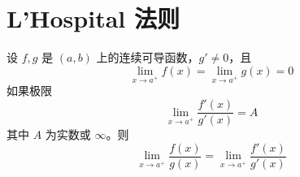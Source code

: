 \section{L'Hospital 法则}



\begin{theorem}
	设 $f,g$ 是 $(a,b)$ 上的连续可导函数，$g' \neq 0$，且
	\[ \lim_{x \to a^{+}} f(x) = \lim_{x \to a^{+}} g(x) = 0 \]	
	如果极限
	\[ \lim_{x \to a^{+}} \frac{f'(x)}{g'(x)} = A \]
	其中 $A$ 为实数或 $\infty$。则
	\[ \lim_{x \to a^{+}} \frac{f(x)}{g(x)} = \lim_{x \to a^{+}} \frac{f'(x)}{g'(x)} \]
\end{theorem}

